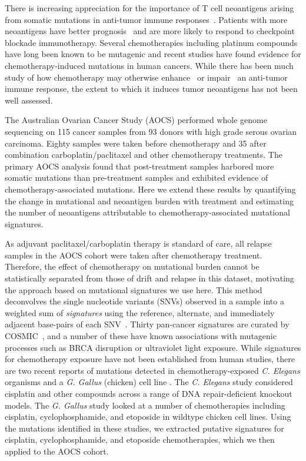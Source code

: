 There is increasing appreciation for the importance of T cell neoantigens arising from somatic mutations in anti-tumor immune responses~\cite{Schumacher_2015}. Patients with more neoantigens have better prognosis~\cite{Brown_2014} and are more likely to respond to checkpoint blockade immunotherapy\cite{Van_Allen_2015,Rizvi_2015}. Several chemotherapies including platinum compounds have long been known to be mutagenic\cite{Hannan_1989} and recent studies have found evidence for chemotherapy-induced mutations in human cancers\cite{Murugaesu_2015,Johnson_2013}. While there has been much study of how chemotherapy may otherwise enhance~\cite{Hato_2012,Machiels2001,Hodge2013} or impair~\cite{Litterman_2013} an anti-tumor immune response, the extent to which it induces tumor neoantigens has not been well assessed.

The Australian Ovarian Cancer Study (AOCS) performed whole genome sequencing on 115 cancer samples from 93 donors with high grade serous ovarian carcinoma\cite{Patch_2015}. Eighty samples were taken before chemotherapy and 35 after combination carboplatin/paclitaxel and other chemotherapy treatments. The primary AOCS analysis found that post-treatment samples harbored more somatic mutations than pre-treatment samples and exhibited evidence of chemotherapy-associated mutations. Here we extend these results by quantifying the change in mutational and neoantigen burden with treatment and estimating the number of neoantigens attributable to chemotherapy-associated mutational signatures.

As adjuvant paclitaxel/carboplatin therapy is standard of care, all relapse samples in the AOCS cohort were taken after chemotherapy treatment. Therefore, the effect of chemotherapy on mutational burden cannot be statistically separated from those of drift and relapse in this dataset, motivating the approach based on mutational signatures we use here. This method deconvolves the single nucleotide variants (SNVs) observed in a sample into a weighted sum of \textit{signatures} using the reference, alternate, and immediately adjacent base-pairs of each SNV~\cite{Alexandrov2013}. Thirty pan-cancer signatures are curated by COSMIC~\cite{364242}, and a number of these have known associations with mutagenic processes such as BRCA disruption or ultraviolet light exposure. While signatures for chemotherapy exposure have not been established from human studies, there are two recent reports of mutations detected in chemotherapy-exposed \textit{C. Elegans} organisms\cite{Meier_2014} and a \textit{G. Gallus} (chicken) cell line \cite{Szikriszt_2016}. The \textit{C. Elegans} study considered cisplatin and other compounds across a range of DNA repair-deficient knockout models. The \textit{G. Gallus} study looked at a number of chemotherapies including cisplatin, cyclophosphamide, and etoposide in wildtype chicken cell lines. Using the mutations identified in these studies, we extracted putative signatures for cisplatin, cyclophosphamide, and etoposide chemotherapies, which we then applied to the AOCS cohort.